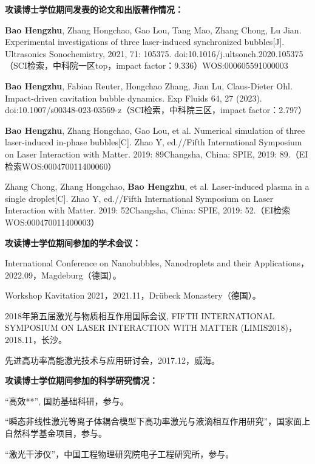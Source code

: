 \begin{publications}{99}

\item[] {{\songti{}\bf{攻读博士学位期间发表的论文和出版著作情况：}}}

\item {{\bf{Bao Hengzhu}}}, Zhang Hongchao, Gao Lou, Tang Mao, Zhang Chong, Lu Jian. Experimental investigations of three laser-induced synchronized bubbles[J]. Ultrasonics Sonochemistry, 2021, 71: 105375. doi:10.1016/j.ultsonch.2020.105375（SCI检索，中科院一区top，impact factor：9.336）WOS:000605591000003

\item {{\bf{Bao Hengzhu}}},  Fabian Reuter, Hongchao Zhang, Jian Lu, Claus-Dieter Ohl. Impact-driven cavitation bubble dynamics. Exp Fluids 64, 27 (2023). doi:10.1007/s00348-023-03569-z（SCI检索，中科院三区，impact factor：2.797）

\item {{\bf{Bao Hengzhu}}}, Zhang Hongchao, Gao Lou, et al. Numerical simulation of three laser-induced in-phase bubbles[C]. Zhao Y, ed.//Fifth International Symposium on Laser Interaction with Matter. 2019: 89Changsha, China: SPIE, 2019: 89.（EI检索WOS:000470011400060）
\item {	Zhang Chong, Zhang Hongchao, {\bf{Bao Hengzhu}}, et al. Laser-induced plasma in a single droplet[C]. Zhao Y, ed.//Fifth International Symposium on Laser Interaction with Matter. 2019: 52Changsha, China: SPIE, 2019: 52.}（EI检索WOS:000470011400003）





\vspace{1.0cm}
\item[] {{\songti{}\bf{攻读博士学位期间参加的学术会议：}}}
\setcounter{enumiv}{0}

\item International Conference on Nanobubbles, Nanodroplets and their Applications，2022.09，Magdeburg（德国）。
\item Workshop Kavitation 2021，2021.11，Drübeck Monastery（德国）。
\item 2018年第五届激光与物质相互作用国际会议, FIFTH INTERNATIONAL SYMPOSIUM ON LASER INTERACTION WITH MATTER (LIMIS2018)，2018.11，长沙。
\item 先进高功率高能激光技术与应用研讨会，2017.12，威海。


\vspace{1.0cm}
\item[] {{\songti{}\bf{攻读博士学位期间参加的科学研究情况：}}}
\setcounter{enumiv}{0}
\item  “高效**”, 国防基础科研，参与。
\item  “瞬态非线性激光等离子体耦合模型下高功率激光与液滴相互作用研究”，国家面上自然科学基金项目，参与。
\item  “激光干涉仪”，中国工程物理研究院电子工程研究所，参与。




\end{publications}
